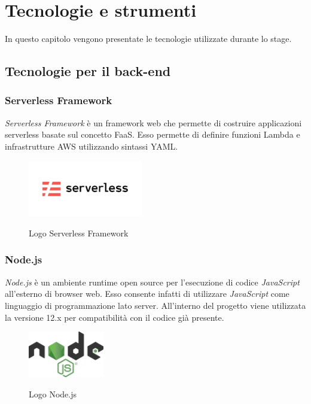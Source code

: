
\chapter{Tecnologie e strumenti}
\label{cap:tecnologie}

In questo capitolo vengono presentate le tecnologie utilizzate durante lo stage.\\

\section{Tecnologie per il back-end}
	\subsection{Serverless Framework}
	\emph{Serverless Framework} è un \gls{framework} web che permette di costruire applicazioni \gls{serverless} basate sul concetto \gls{FaaS}. Esso permette di definire funzioni Lambda e infrastrutture \gls{AWS} utilizzando sintassi \gls{YAML}.
	
	\begin{figure}[H]
		\centering
		\includegraphics[width=5cm]{immagini/serverless.png} \\
		\caption{\label{fig:logo_serverless} Logo Serverless Framework}
	\end{figure}
	
	\subsection{Node.js}
	\emph{Node.js} è un ambiente runtime open source per l'esecuzione di codice \emph{JavaScript} all'esterno di browser web. Esso consente infatti di utilizzare \emph{JavaScript} come linguaggio di programmazione lato server. All'interno del progetto
	viene utilizzata la versione 12.x per compatibilità con il codice già presente.
	
	\begin{figure}[H]
		\centering
		\includegraphics[width=3.3cm]{immagini/nodejs.png} \\
		\caption{\label{fig:logo_node} Logo Node.js}
	\end{figure}
	
